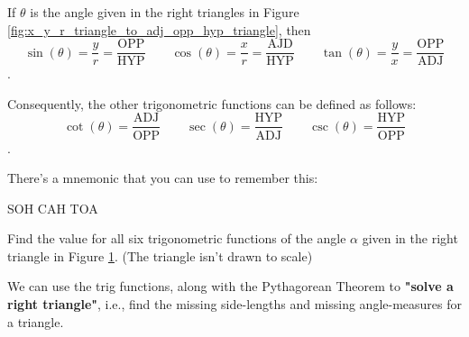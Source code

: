 \newpage

\begin{definition}
  If $\theta$ is the angle given in the right triangles in Figure
  \ref{fig:x_y_r_triangle_to_adj_opp_hyp_triangle}, then
	\[
		\sin (\theta) = \frac{y}{r} =  \frac{\textrm{OPP}}{\textrm{HYP}}
		\qquad \cos (\theta) = \frac{x}{r} = \frac{\textrm{AJD}}{\textrm{HYP}}
		\qquad \tan (\theta) = \frac{y}{x} = \frac{\textrm{OPP}}{\textrm{ADJ}}
	\].

	Consequently, the other trigonometric functions can be defined as follows:
	\[
		\cot (\theta) = \frac{\textrm{ADJ}}{\textrm{OPP}}
		\qquad \sec (\theta) = \frac{\textrm{HYP}}{\textrm{ADJ}}
		\qquad \csc (\theta) = \frac{\textrm{HYP}}{\textrm{OPP}}
	\].

	There's a mnemonic that you can use to remember this:

	\begin{center}
		\textrm{SOH CAH TOA}
	\end{center}
\end{definition}

\begin{exc}
  \label{exc:find_value_for_all_six_trigonometric_functions}

  Find the value for all six trigonometric functions of the angle $\alpha$ given
  in the right triangle in Figure \ref{fig:alpha_triangle}. (The triangle isn't
  drawn to scale)

  \begin{figure}[H]
    \centering


    \caption{}
    \label{fig:alpha_triangle}
  \end{figure}
\end{exc}

We can use the trig functions, along with the Pythagorean Theorem to
\textbf{"solve a right triangle"}, i.e., find the missing side-lengths and
missing angle-measures for a triangle.


